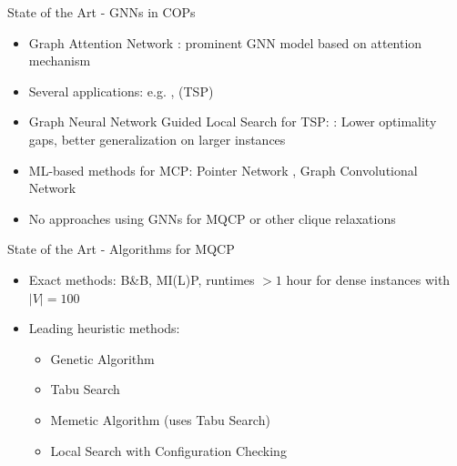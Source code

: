 \documentclass{beamer}
\begin{document}
\begin{frame}{State of the Art - GNNs in COPs}
    \begin{itemize}
        \item<1-> Graph Attention Network \cite{Velickovic2018}: prominent GNN model based on attention mechanism \cite{Bahdanau2015}
        \item<2-> Several applications: e.g. \cite{Kool2019}, \cite{Joshi2021} (TSP)
        \item<3-> Graph Neural Network Guided Local Search for TSP: \cite{Hudson2021}: Lower optimality gaps, better generalization on larger instances
        \item<4-> ML-based methods for MCP: Pointer Network \cite{Gu2020}, Graph Convolutional Network \cite{Li2018}
        \item<5-> No approaches using GNNs for MQCP or other clique relaxations
    \end{itemize}
\end{frame}

\begin{frame}{State of the Art - Algorithms for MQCP}
    \begin{itemize}
        \item<1-> Exact methods: B\&B, MI(L)P, runtimes $> 1$ hour for dense instances with $|V|=100$
        \item<2-> Leading heuristic methods:
        \begin{itemize}
            \item<3-> Genetic Algorithm \cite{pinto_biased_2018}
            \item<4-> Tabu Search \cite{djeddi_extension_2019}
            \item<5-> Memetic Algorithm (uses Tabu Search) \cite{zhou_opposition-based_2020}
            \item<6-> Local Search with Configuration Checking \cite{chen_nuqclq_2021}
        \end{itemize}
    \end{itemize}
\end{frame}
\end{document}
